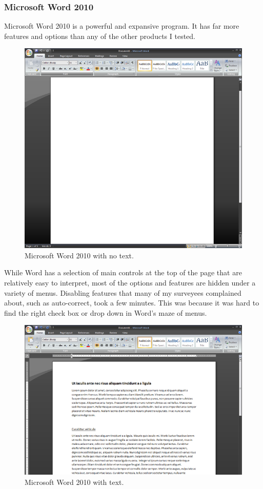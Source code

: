\documentclass[10pt]{article}
\begin{document}
\subsubsection{Microsoft Word 2010}

Microsoft Word 2010 is a powerful and expansive program. It has far more features and options than any of the other products I tested.

\begin{figure}
   \centering
      \includegraphics[width=130mm]{images/BlankWord.png}
   \caption{Microsoft Word 2010 with no text.}
\end{figure}

While Word has a selection of main controls at the top of the page that are relatively easy to interpret, most of the options and features are hidden under a variety of menus. Disabling features that many of my surveyees complained about, such as auto-correct, took a few minutes. This was because it was hard to find the right check box or drop down in Word's maze of menus.

\begin{figure}
   \centering
      \includegraphics[width=130mm]{images/TextWord.png}
   \caption{Microsoft Word 2010 with text.}
\end{figure}
\end{document}
